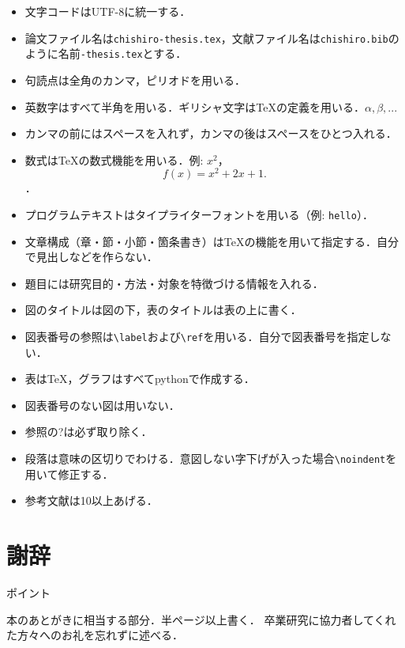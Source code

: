 \documentclass[a4j,11pt,report]{jsbook}
\newcommand{\point}[1]{
\begin{itembox}[l]{ポイント}
  #1
\end{itembox}
}
\begin{document}
\begin{itemize}
  \item 文字コードはUTF-8に統一する．
  \item 論文ファイル名は\texttt{chishiro-thesis.tex}，文献ファイル名は\texttt{chishiro.bib}のように名前\texttt{-thesis.tex}とする．
  \item 句読点は全角のカンマ，ピリオドを用いる．
  \item 英数字はすべて半角を用いる．ギリシャ文字は{\TeX}の定義を用いる．$\alpha, \beta, ...$
  \item カンマの前にはスペースを入れず，カンマの後はスペースをひとつ入れる．
  \item 数式は{\TeX}の数式機能を用いる．例: $x^2$，\[f(x) = x^2 + 2x + 1.\]．
  \item プログラムテキストはタイプライターフォントを用いる（例: \texttt{hello}）．
  \item 文章構成（章・節・小節・箇条書き）は{\TeX}の機能を用いて指定する．自分で見出しなどを作らない．
  \item 題目には研究目的・方法・対象を特徴づける情報を入れる．
  \item 図のタイトルは図の下，表のタイトルは表の上に書く．
  \item 図表番号の参照は\verb#\label#および\verb#\ref#を用いる．自分で図表番号を指定しない．
  \item 表は{\TeX}，グラフはすべてpythonで作成する．
  \item 図表番号のない図は用いない．
  \item 参照の?は必ず取り除く．
  \item 段落は意味の区切りでわける．意図しない字下げが入った場合\verb#\noindent#を用いて修正する．
  \item 参考文献は10以上あげる．
\end{itemize}


\chapter*{謝辞 \label{ch:acknowledgement}}
\thispagestyle{empty}
\point{
本のあとがきに相当する部分．半ページ以上書く．
卒業研究に協力者してくれた方々へのお礼を忘れずに述べる．
}
\end{document}
